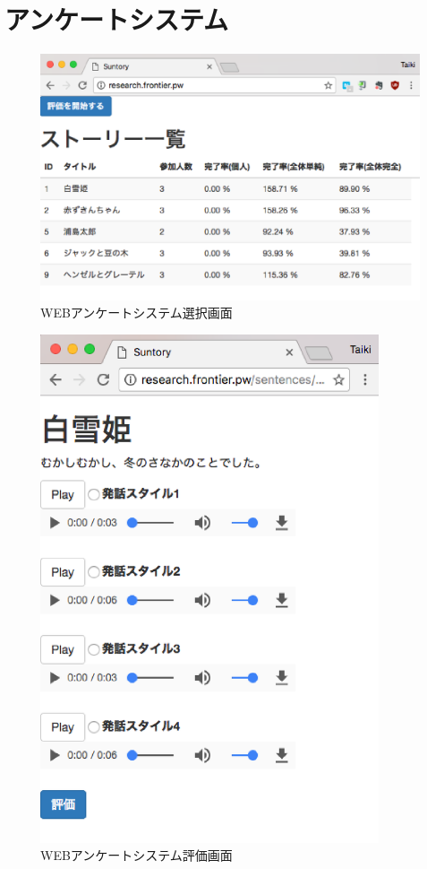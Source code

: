 \section{アンケートシステム}

\begin{figure}[h]
  \begin{center}
    \includegraphics[clip,width=14.0cm]{fig/web-index.eps}
    \caption{WEBアンケートシステム選択画面}
    \label{fig:index-web}
  \end{center}
\end{figure}

\begin{figure}[h]
  \begin{center}
    \includegraphics[clip,width=10.0cm]{fig/web.eps}
    \caption{WEBアンケートシステム評価画面}
    \label{fig:web}
  \end{center}
\end{figure}

